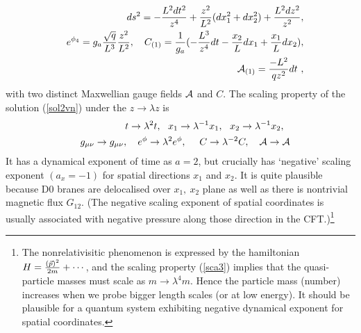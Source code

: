 \documentclass[12pt]{article}
\def\bea{\begin{eqnarray}} \def\eea{\end{eqnarray}} \def\ba{\begin{array}}
\newcommand{\eqn}[1]{(\ref{#1})}
\def\m{\mu}
\def\n{\nu}
\def\br{\nonumber\\}
\begin{document}
\bea\label{sol2vn}
&&ds^2=- {L^2dt^2\over  z^4} +{z^2\over L^2}(dx_1^2+dx_2^2)+{L^2 dz^2\over
z^2}     ,\br
&&e^{\phi_4}=  g_a {\sqrt{q}\over L^3}{z^2\over L^2}, ~~~
C_{(1)}= {1\over g_a}(-{L^3\over z^4}  dt - {x_2\over L} dx_1 + {x_1\over L} dx_2)
,  \br 
&& {\cal{A}}_{(1)}=  {-L^2\over q  z^2}dt  \ ,
\eea
with two distinct Maxwellian gauge fields ${\cal{A}}$ and $C$.
The scaling property of the  solution \eqn{sol2vn} under 
the $z\to\lambda z$ is
\bea\label{sca3}
&& t\to\lambda^2 t,~~ 
x_1\to\lambda^{-1} x_1,~~ 
x_2\to\lambda^{-1} x_2,~~ \br
&& g_{\m\n}\to g_{\m\n},~~~e^\phi\to \lambda^2 e^\phi, ~~~~
C\to\lambda^{-2} C ,~~~
 {\cal{A}} \to {\cal{A}} 
\eea
It  has a dynamical exponent of time as $a=2$, but crucially
has `negative' scaling exponent $(a_{x}=-1)$ for  spatial directions 
$x_1$ and $x_2$. It is quite plausible because D0 branes are delocalised 
over $x_1,~x_2$ plane as well as there is nontrivial
magnetic flux $G_{12}$. (The negative scaling exponent 
of spatial coordinates is usually associated with negative 
pressure along those direction 
in the CFT.)\footnote{The nonrelativisitic phenomenon  is expressed 
by the hamiltonian $H={(\vec{p})^2 \over 2m} + \cdots$, and  the scaling
property \eqn{sca3} implies that the quasi-particle masses 
must scale as $m\to \lambda^4 m$. Hence the particle
mass (number)  increases when we probe  bigger length scales 
(or at low energy). It should be
plausible for a quantum system exhibiting negative dynamical
exponent for spatial coordinates.}
\end{document}
